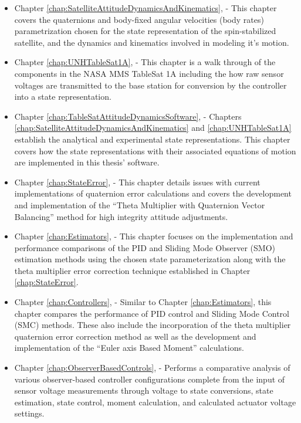 \begin{itemize}
\item Chapter \ref{chap:SatelliteAttitudeDynamicsAndKinematics},  - This chapter covers the quaternions and body-fixed angular velocities (body rates) parametrization chosen for the state representation of the spin-stabilized satellite, and the dynamics and kinematics involved in modeling it's motion.
\item Chapter \ref{chap:UNHTableSat1A},  - This chapter is a walk through of the components in the NASA MMS TableSat 1A including the how raw sensor voltages are transmitted to the base station for conversion by the controller into a state representation.
\item Chapter \ref{chap:TableSatAttitudeDynamicsSoftware},  - Chapters \ref{chap:SatelliteAttitudeDynamicsAndKinematics} and \ref{chap:UNHTableSat1A} establish the analytical and experimental state representations.  This chapter covers how the state representations with their associated equations of motion are implemented in this thesis' software.
\item Chapter \ref{chap:StateError},  - This chapter details issues with current implementations of quaternion error calculations and covers the development and implementation of the ``Theta Multiplier with Quaternion Vector Balancing'' method for high integrity attitude adjustments.
\item Chapter \ref{chap:Estimators},  - This chapter focuses on the implementation and performance comparisons of the PID and Sliding Mode Observer (SMO) estimation methods using the chosen state parameterization along with the theta multiplier error correction technique established in Chapter \ref{chap:StateError}.
\item Chapter \ref{chap:Controllers},  - Similar to Chapter \ref{chap:Estimators}, this chapter compares the performance of PID control and Sliding Mode Control (SMC) methods.  These also include the incorporation of the theta multiplier quaternion error correction method as well as the development and implementation of the ``Euler axis Based Moment'' calculations.
\item Chapter \ref{chap:ObserverBasedControls},  - Performs a comparative analysis of various observer-based controller configurations complete from the input of sensor voltage measurements through voltage to state conversions, state estimation, state control, moment calculation, and calculated actuator voltage settings.

\end{itemize}
